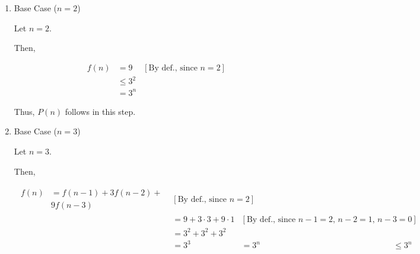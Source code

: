 \documentclass[12pt]{article}
\begin{document}
\begin{itemize}
\begin{mdframed}
\begin{enumerate}[1.]
\begin{mdframed}
        \bigskip

        Then,

        \begin{align}
            f(n) &= 1 & [\text{By def., since $n = 1$}]\\
            &\leq 3^1\\
            &= 3^n
        \end{align}

        \bigskip

        Thus, $P(n)$ follows in this step.
        \end{mdframed}

        \item Base Case ($n = 2$)

        \begin{mdframed}
        Let $n = 2$.

        \bigskip

        Then,

        \begin{align}
            f(n) &= 9 & [\text{By def., since $n = 2$}]\\
            &\leq 3^2\\
            &= 3^n
        \end{align}

        \bigskip

        Thus, $P(n)$ follows in this step.
        \end{mdframed}

        \item Base Case ($n = 3$)

        \begin{mdframed}
        Let $n = 3$.

        \bigskip

        Then,

        \begin{align}
            \begin{split}
            f(n) &= f(n-1) + 3f(n-2) +\\
            &9f(n-3)
            \end{split} & [\text{By def., since $n = 2$}]\\
            &= 9 + 3 \cdot 3 + 9 \cdot 1 & [\text{By def., since $n-1 = 2$, $n-2=1$, $n-3=0$}]\\
            &= 3^2 + 3^2 + 3^2\\
            &= 3^3
            &= 3^n
            &\leq 3^n
        \end{align}


\end{mdframed}
\end{enumerate}
\end{mdframed}
\end{itemize}
\end{document}
